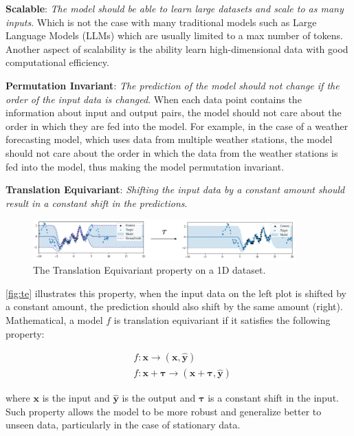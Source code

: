 \documentclass[../../main.tex]{subfiles}
\begin{document}
\textbf{Scalable}: \emph{The model should be able to learn large datasets and scale to as many inputs}. Which is not the case with many traditional models such as Large Language Models (LLMs) which are usually limited to a max number of tokens. Another aspect of scalability is the ability learn high-dimensional data with good computational efficiency.


\textbf{Permutation Invariant}: \emph{The prediction of the model should not change if the order of the input data is changed}. When each data point contains the information about input and output pairs, the model should not care about the order in which they are fed into the model. For example, in the case of a weather forecasting model, which uses data from multiple weather stations, the model should not care about the order in which the data from the weather stations is fed into the model, thus making the model permutation invariant.

\textbf{Translation Equivariant}: \emph{Shifting the input data by a constant amount should result in a constant shift in the predictions}. 

\begin{figure}[H]
	\centering
	\includegraphics[width=0.9\textwidth]{./te.png}
	\caption{The Translation Equivariant property on a 1D dataset.}
	\label{fig:te}
\end{figure}


\autoref{fig:te} illustrates this property, when the input data on the left plot is shifted by a constant amount, the prediction should also shift by the same amount (right). Mathematical, a model $f$ is translation equivariant if it satisfies the following property:

\begin{align}
	&f: \bm{x} \rightarrow (\bm{x}, \bm{\hat{y}}) \\
	&f: \bm{x} + \bm{\tau} \rightarrow (\bm{x} + \bm{\tau}, \bm{\hat{y}})
\end{align}

where $\bm{x}$ is the input and $\bm{\hat{y}}$ is the output and $\bm{\tau}$ is a constant shift in the input. Such property allows the model to be more robust and generalize better to unseen data, particularly in the case of stationary data.
\end{document}
